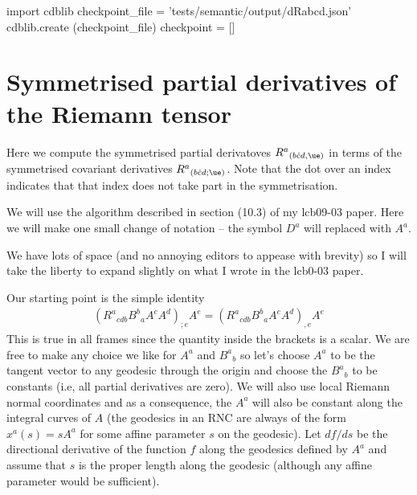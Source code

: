 \documentclass[12pt]{cdblatex}
\begin{document}

\bgroup
{}
\begin{cadabra}
   import cdblib
   checkpoint_file = 'tests/semantic/output/dRabcd.json'
   cdblib.create (checkpoint_file)
   checkpoint = []
\end{cadabra}
\egroup

\section*{Symmetrised partial derivatives of the Riemann tensor}

Here we compute the symmetrised partial derivatoves $R^{a}{}_{(b{\Dot c}d,\ue)}$ in terms of
the symmetrised covariant derivatives $R^{a}{}_{(b{\Dot c}d;\ue)}$. Note that the dot over an
index indicates that that index does not take part in the symmetrisation.

We will use the algorithm described in section (10.3) of my lcb09-03 paper. Here we will make
one small change of notation -- the symbol $D^a$ will replaced with $A^a$.

We have lots of space (and no annoying editors to appease with brevity) so I will take the
liberty to expand slightly on what I wrote in the lcb0-03 paper.

Our starting point is the simple identity
\begin{align}
   \label{eqn:submain}
   \left( R^{a}{}_{cdb} B^{b}{}_{a} A^{c} A^{d} \right)_{;e} A^{e}
   =
   \left( R^{a}{}_{cdb} B^{b}{}_{a} A^{c} A^{d} \right)_{,e} A^{e}
\end{align}
This is true in all frames since the quantity inside the brackets is a scalar. We are free to
make any choice we like for $A^{a}$ and $B^{a}{}_{b}$ so let's choose $A^{a}$ to be the tangent
vector to any geodesic through the origin and choose the $B^{a}{}_{b}$ to be constants (i.e,
all partial derivatives are zero). We will also use local Riemann normal coordinates and as a
consequence, the $A^{a}$ will also be constant along the integral curves of $A$ (the geodesics
in an RNC are always of the form $x^{a}(s) = s A^{a}$ for some affine parameter $s$ on the
geodesic). Let $df/ds$ be the directional derivative of the function $f$ along the geodesics
defined by $A^{a}$ and assume that $s$ is the proper length along the geodesic (although any
affine parameter would be sufficient).
\end{document}
